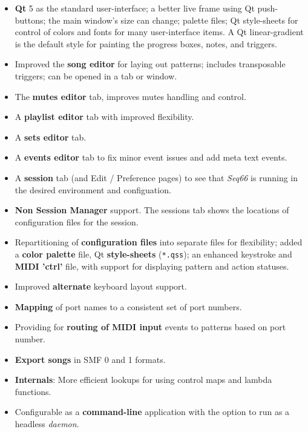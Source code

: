 \documentclass[
 11pt,
 twoside,
 a4paper,
 final                                 %
]{article}
\begin{document}
   \begin{itemize}
      \item \textbf{Qt} 5 as the standard user-interface;
         a better live frame using Qt push-buttons;
         the main window's size can change;
         palette files;
         Qt style-sheets for control of colors and fonts for many
         user-interface items.
         A Qt linear-gradient is the default style for painting the
         progress boxes, notes, and triggers.
      \item Improved the \textbf{song editor} for laying out patterns;
         includes transposable triggers;
         can be opened in a tab or window.
      \item The \textbf{mutes editor} tab, improves mutes handling and control.
      \item A \textbf{playlist editor} tab with improved flexibility.
      \item A \textbf{sets editor} tab.
      \item A \textbf{events editor} tab to fix minor event issues and add meta text
         events.
      \item A \textbf{session} tab (and Edit / Preference pages) to see that
         \textsl{Seq66} is running in the desired environment and configuation.
      \item \textbf{Non Session Manager} support. The sessions tab shows the
         locations of configuration files for the session.
      \item Repartitioning of \textbf{configuration files} into separate files
         for flexibility; added a \textbf{color palette} file,
         Qt \textbf{style-sheets} (\texttt{*.qss});
         an enhanced keystroke and \textbf{MIDI 'ctrl'} file, with
         support for displaying pattern and action statuses.
      \item Improved \textbf{alternate} keyboard layout support.
      \item \textbf{Mapping} of port names to a consistent set of port numbers.
      \item Providing for \textbf{routing of MIDI input} events to
         patterns based on port number.
      \item \textbf{Export songs} in SMF 0 and 1 formats.
      \item \textbf{Internals}:
         More efficient lookups for using control maps and lambda functions.
      \item Configurable as a \textbf{command-line} application
         with the option to run as a headless \textsl{daemon}.
   \end{itemize}
\end{document}
